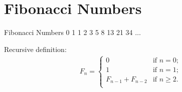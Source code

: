 \documentclass{beamer}
\begin{document}
\section{Fibonacci Numbers}

\begin{frame}{Fibonacci Numbers}
    \centering
    \LARGE
    0 \hspace{2mm} 1 \hspace{2mm} 1 \hspace{2mm} 2 \hspace{2mm} 3 \hspace{2mm} 5 \hspace{2mm} 8 \hspace{2mm} 13 \hspace{2mm} 21 \hspace{2mm} 34 \hspace{2mm} $\ldots$ \pause
    \begin{alertblock}{Recursive definition:}
        \begin{align*}
            F_n =
                \begin{cases}
                    0 & \text{if $n = 0$;} \\
                    1 & \text{if $n = 1$;} \\
                    F_{n - 1} + F_{n - 2} & \text{if $n \geq 2$.}\\
                \end{cases}
        \end{align*}
    \end{alertblock}
\end{frame}
\end{document}
